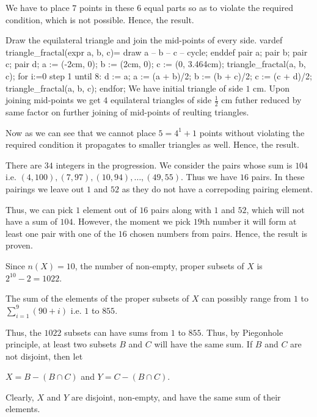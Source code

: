   We have to place $7$ points in these $6$ equal parts so as to violate the required condition, which is not
  possible. Hence, the result.
\item Draw the equilateral triangle and join the mid-points of every side.
  \startplacefigure[location=none]
    \startMPinclusions
      vardef triangle_fractal(expr a, b, c)=
      draw a -- b -- c -- cycle;
      enddef
    \stopMPinclusions
    \startMPcode
      pair a; pair b; pair c; pair d;
      a := (-2cm, 0); b := (2cm, 0); c := (0, 3.464cm);
      triangle_fractal(a, b, c);
      for i:=0 step 1 until 8:
      d := a;
      a := (a + b)/2; b := (b + c)/2; c := (c + d)/2;
      triangle_fractal(a, b, c);
      endfor;
    \stopMPcode
  \stopplacefigure
  We have initial triangle of side $1$ cm. Upon joining mid-points we get $4$ equilateral triangles of side
  $\frac{1}{2}$ cm futher reduced by same factor on further joining of mid-points of reulting triangles.

  Now as we can see that we cannot place $5 = 4^1 + 1$ points without violating the required condition it
  propagates to smaller triangles as well. Hence, the result.
\item There are $34$ integers in the progression. We consider the pairs whose sum is $104$ i.e. $(4, 100),
  (7, 97), (10, 94), \ldots, (49, 55)$. Thus we have $16$ pairs. In these pairings we leave out $1$ and $52$
  as they do not have a correpoding pairing element.

  Thus, we can pick $1$ element out of $16$ pairs along with $1$ and $52$, which will not have a sum of
  $104$. However, the moment we pick $19$th number it will form at least one pair with one of the $16$
  chosen numbers from pairs. Hence, the result is proven.
\item Since $n(X) = 10$, the number of non-empty, proper subsets of $X$ is $2^{10} - 2 = 1022$.

  The sum of the elements of the proper subsets of $X$ can possibly range from $1$ to
  $\displaystyle\sum_{i=1}^9(90 + i)$ i.e. $1$ to $855$.

  Thus, the $1022$ subsets can have sums from $1$ to $855$. Thus, by Piegonhole principle, at least two
  subsets $B$ and $C$ will have the same sum. If $B$ and $C$ are not disjoint, then let

  $X = B - (B\cap C)$ and $Y = C - (B\cap C)$.

  Clearly, $X$ and $Y$ are disjoint, non-empty, and have the same sum of their elements.


